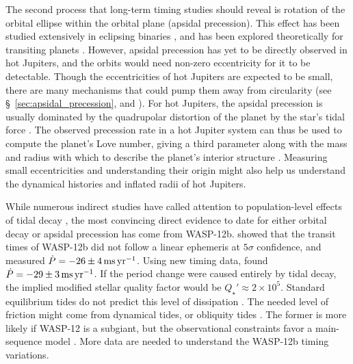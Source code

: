 \documentclass[12pt,twocolumn,tighten]{aastex62}
\begin{document}
The second process that long-term timing studies should reveal is
rotation of the orbital ellipse within the orbital plane (apsidal
precession).  This effect has been studied extensively in eclipsing
binaries \citep[{\it e.g.},][]{
  schwarzschild_structure_1958,torres_accurate_2010,borkovits_eclipse_2015},
and has been explored theoretically for transiting planets
\citep{heyl_using_2007,pal_periastron_2008,jordan_observability_2008,ragozzine_probing_2009}.
However, apsidal precession has yet to be directly observed in hot
Jupiters, and the orbits would need non-zero eccentricity for it to be
detectable.  Though the eccentricities of hot Jupiters are expected to
be small, there are many mechanisms that could pump them away from
circularity (see \S~\ref{sec:apsidal_precession}, and
\citealt{bailey_understanding_2019}).  For hot Jupiters, the apsidal
precession is usually dominated by the quadrupolar distortion of the
planet by the star's tidal force \citep{ragozzine_probing_2009}.  The
observed precession rate in a hot Jupiter system can thus be used to
compute the planet's Love number, giving a third parameter along with
the mass and radius with which to describe the planet's interior
structure \citep[{\it e.g.},][who performed a similar procedure for
HAT-P-13b]{batygin_determination_2009}.  Measuring small
eccentricities and understanding their origin might also help us
understand the dynamical histories and inflated radii of hot Jupiters.
\citep[{\it
e.g.},][respectively]{dawson_origins_2018,ibgui_tidal_2010}

While numerous indirect studies have called attention to
population-level effects of tidal decay
\citep{jackson_observational_2009,hansen_calibration_2010,penev_constraining_2012,husnoo_observational_2012,matsakos_origin_2016,cameron_hierarchical_2018,penev_empirical_2018},
the most convincing direct evidence to date for either orbital decay
or apsidal precession has come from WASP-12b.
\citet{maciejewski_departure_2016} showed that the transit times of
WASP-12b did not follow a linear ephemeris at $5\sigma$ confidence,
and measured $\dot{P} = -26 \pm 4\,{\rm ms}\,{\rm yr}^{-1}$.  Using
new timing data, \citet{patra_2017} found $\dot{P} = -29 \pm 3\,{\rm
ms}\,{\rm yr}^{-1}$.  If the period change were caused entirely by
tidal decay, the implied modified stellar quality factor would be
$Q_\star' \approx 2\times10^5$.  Standard equilibrium tides do not
predict this level of dissipation
\citep{penev_tidal_2011,ogilvie_tidal_2014}.  The needed level of
friction might come from dynamical tides, or obliquity tides
\citep{weinberg_tidal_2017,millholland_obliquity_2018}.  The former is
more likely if WASP-12 is a subgiant, but the observational
constraints favor a main-sequence model
\citep{bailey_understanding_2019}.  More data are needed to understand
the WASP-12b timing variations.
\end{document}

